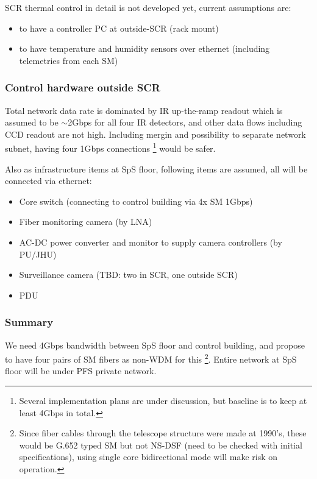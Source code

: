 \documentclass[a4paper,notitlepage]{article}
\begin{document}
SCR thermal control in detail is not developed yet, current assumptions are: 
\begin{itemize}
  \item to have a controller PC at outside-SCR (rack mount)
  \item to have temperature and humidity sensors over ethernet
    (including telemetries from each SM) 
\end{itemize}


\subsubsection{Control hardware outside SCR}

Total network data rate is dominated by IR up-the-ramp readout which 
is assumed to be $\sim$2Gbps for all four IR detectors, and other data flows 
including CCD readout are not high. 
Including mergin and possibility to separate network subnet, having four 1Gbps 
connections
\footnote{Several implementation plans are under discussion, but baseline is 
to keep at least 4Gbps in total. } 
would be safer. 

Also as infrastructure items at SpS floor, following items are assumed, 
all will be connected via ethernet: 

\begin{itemize}
  \item Core switch (connecting to control building via 4x SM 1Gbps)
  \item Fiber monitoring camera (by LNA)
  \item AC-DC power converter and monitor to supply camera controllers
    (by PU/JHU)
  \item Surveillance camera (TBD: two in SCR, one outside SCR)
  \item PDU
\end{itemize}


\subsubsection{Summary}

We need 4Gbps bandwidth between SpS floor and control building, and 
propose to have four pairs of SM fibers as non-WDM for this
\footnote{Since fiber cables through the telescope structure were made 
at 1990's, these would be G.652 typed SM but not NS-DSF (need to be checked 
with initial specifications), using single core bidirectional mode will 
make risk on operation.}. 
Entire network at SpS floor will be under PFS private network. 
\end{document}
